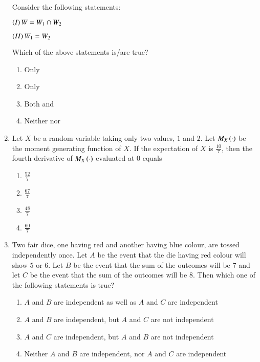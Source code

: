 \documentclass[journal]{IEEEtran}
\numberwithin{equation}{enumi}
\numberwithin{figure}{enumi}
\begin{document}
\begin{enumerate}
Consider the following statements:

$\left(I\right) W = W_1 \cap W_2$

$\left(II\right) W_1 = W_2$

Which of the above statements is/are true?

\begin{enumerate}[label=\brak{\Alph*}]
\item Only 

\item Only 

\item Both  and 

\item Neither  nor 
\end{enumerate}

\item Let $X$ be a random variable taking only two values, $1$ and $2$. Let $M_X\left(\cdot\right)$ be the moment generating function of $X$. If the expectation of $X$ is $\frac{10}{7}$, then the fourth derivative of $M_X\left(\cdot\right)$ evaluated at $0$ equals

\begin{enumerate}
    \item $\frac{52}{7}$
    \item $\frac{67}{7}$
    \item $\frac{48}{7}$
    \item $\frac{60}{7}$
\end{enumerate}

\item Two fair dice, one having red and another having blue colour, are tossed independently once. Let $A$ be the event that the die having red colour will show $5$ or $6$. Let $B$ be the event that the sum of the outcomes will be $7$ and let $C$ be the event that the sum of the outcomes will be $8$. Then which one of the following statements is true?

\begin{enumerate}
    \item $A$ and $B$ are independent as well as $A$ and $C$ are independent
    \item $A$ and $B$ are independent, but $A$ and $C$ are not independent
    \item $A$ and $C$ are independent, but $A$ and $B$ are not independent
    \item Neither $A$ and $B$ are independent, nor $A$ and $C$ are independent
\end{enumerate}


\end{enumerate}
\end{document}
